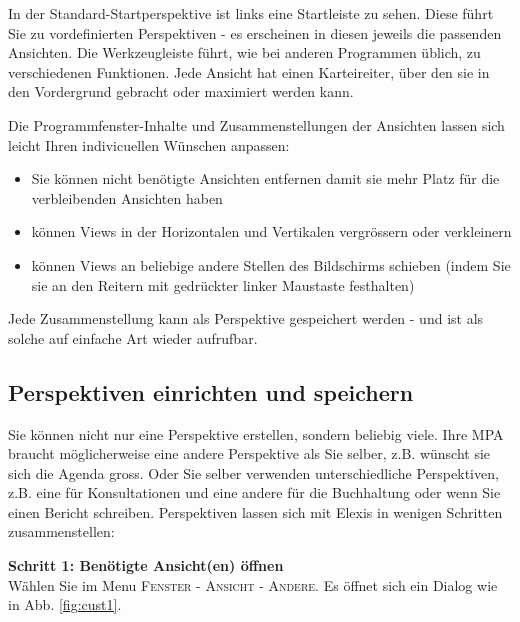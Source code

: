 In der Standard-Startperspektive ist links eine \glqq Startleiste\grqq{} zu
sehen. Diese führt Sie zu vordefinierten Perspektiven - es erscheinen in diesen
jeweils die passenden Ansichten. Die Werkzeugleiste führt, wie bei anderen
Programmen üblich, zu verschiedenen Funktionen. Jede Ansicht hat einen
Karteireiter, über den sie in den Vordergrund gebracht oder maximiert werden kann.
\par
{}
\medskip
Die Programmfenster-Inhalte und Zusammenstellungen der Ansichten lassen sich leicht Ihren indivicuellen Wünschen anpassen:\\

\begin{itemize}
  \item Sie können nicht benötigte Ansichten entfernen damit sie mehr Platz für
  die verbleibenden Ansichten haben
	\item können Views in der Horizontalen und Vertikalen vergrössern oder verkleinern
	\item können Views an beliebige andere Stellen des Bildschirms schieben (indem Sie sie
	an den Reitern mit gedrückter linker Maustaste \glqq festhalten\grqq{})
\end{itemize}

Jede Zusammenstellung kann als Perspektive gespeichert werden - und ist als
solche auf einfache Art wieder aufrufbar.

\subsection{Perspektiven einrichten und speichern}
\label{tour:customize}
Sie können nicht nur eine Perspektive erstellen, sondern beliebig viele. Ihre MPA braucht möglicherweise eine andere Perspektive als Sie selber, z.B. wünscht sie sich die Agenda gross. Oder Sie selber verwenden unterschiedliche Perspektiven, z.B. eine für Konsultationen und eine andere für die Buchhaltung oder wenn Sie einen Bericht schreiben. Perspektiven lassen sich mit Elexis in wenigen Schritten zusammenstellen:\\

\bigskip

\textbf{Schritt 1: Benötigte Ansicht(en) öffnen}\\

Wählen Sie im Menu \textsc{Fenster - Ansicht - Andere}. Es öffnet sich ein Dialog wie in Abb. \ref{fig:cust1}.\\

